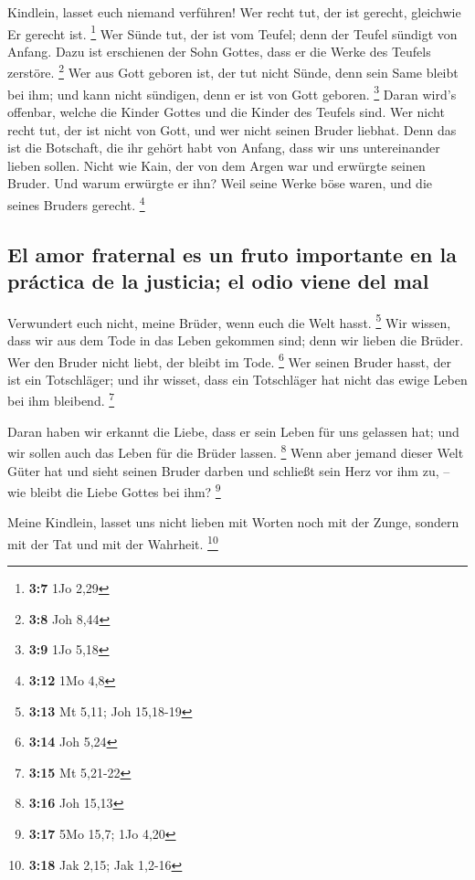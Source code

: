  Kindlein, lasset euch niemand verführen! Wer recht tut,
der ist gerecht, gleichwie Er gerecht ist. \footnote{\textbf{3:7} 1Jo
  2,29}  Wer Sünde tut, der ist vom Teufel; denn der
Teufel sündigt von Anfang. Dazu ist erschienen der Sohn Gottes, dass er
die Werke des Teufels zerstöre. \footnote{\textbf{3:8} Joh 8,44}
 Wer aus Gott geboren ist, der tut nicht Sünde, denn sein
Same bleibt bei ihm; und kann nicht sündigen, denn er ist von Gott
geboren. \footnote{\textbf{3:9} 1Jo 5,18}  Daran wird's
offenbar, welche die Kinder Gottes und die Kinder des Teufels sind. Wer
nicht recht tut, der ist nicht von Gott, und wer nicht seinen Bruder
liebhat.  Denn das ist die Botschaft, die ihr gehört habt
von Anfang, dass wir uns untereinander lieben sollen. 
Nicht wie Kain, der von dem Argen war und erwürgte seinen Bruder. Und
warum erwürgte er ihn? Weil seine Werke böse waren, und die seines
Bruders gerecht. \footnote{\textbf{3:12} 1Mo 4,8}

\hypertarget{el-amor-fraternal-es-un-fruto-importante-en-la-pruxe1ctica-de-la-justicia-el-odio-viene-del-mal}{%
\subsection{El amor fraternal es un fruto importante en la práctica de
la justicia; el odio viene del
mal}\label{el-amor-fraternal-es-un-fruto-importante-en-la-pruxe1ctica-de-la-justicia-el-odio-viene-del-mal}}

 Verwundert euch nicht, meine Brüder, wenn euch die Welt
hasst. \footnote{\textbf{3:13} Mt 5,11; Joh 15,18-19} 
Wir wissen, dass wir aus dem Tode in das Leben gekommen sind; denn wir
lieben die Brüder. Wer den Bruder nicht liebt, der bleibt im Tode.
\footnote{\textbf{3:14} Joh 5,24}  Wer seinen Bruder
hasst, der ist ein Totschläger; und ihr wisset, dass ein Totschläger hat
nicht das ewige Leben bei ihm bleibend. \footnote{\textbf{3:15} Mt
  5,21-22}

 Daran haben wir erkannt die Liebe, dass er sein Leben
für uns gelassen hat; und wir sollen auch das Leben für die Brüder
lassen. \footnote{\textbf{3:16} Joh 15,13}  Wenn aber
jemand dieser Welt Güter hat und sieht seinen Bruder darben und schließt
sein Herz vor ihm zu, -- wie bleibt die Liebe Gottes bei ihm?
\footnote{\textbf{3:17} 5Mo 15,7; 1Jo 4,20}

 Meine Kindlein, lasset uns nicht lieben mit Worten noch
mit der Zunge, sondern mit der Tat und mit der Wahrheit. \footnote{\textbf{3:18}
  Jak 2,15; Jak 1,2-16}

